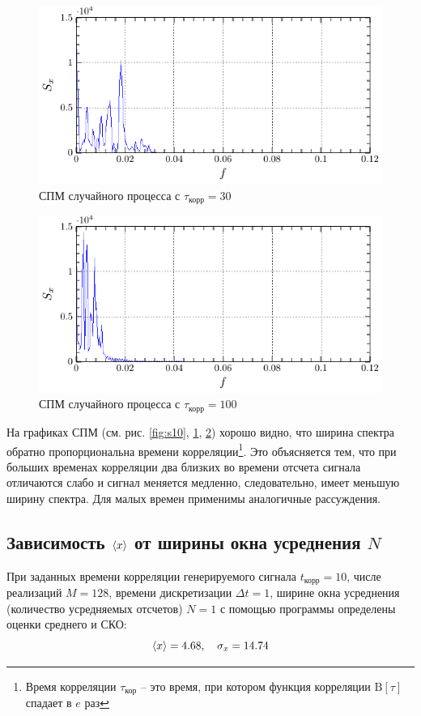 \documentclass[a4paper,14pt]{extarticle}
\begin{document}
\begin{figure}[H]
    \centering
    \includegraphics[width=0.7\linewidth]{fig/S_from_f_30.pdf}
    \vspace{-0.7em}
    \caption{СПМ случайного процесса с $\tau_\text{корр}=30$}
    \label{fig:s30}
\end{figure}

\begin{figure}[H]
    \centering
    \includegraphics[width=0.7\linewidth]{fig/S_from_f_100.pdf}
    \vspace{-0.7em}
    \caption{СПМ случайного процесса с $\tau_\text{корр}=100$}
    \label{fig:s100}
\end{figure}

На графиках СПМ (см. рис. \ref{fig:s10}, \ref{fig:s30}, \ref{fig:s100}) хорошо видно, что ширина спектра обратно пропорциональна времени корреляции\footnote{Время корреляции $\tau_\text{кор}$  -- это время, при котором функция корреляции $\mathrm{B}[\tau]$ спадает в $e$ раз}. Это объясняется тем, что при больших временах корреляции два близких во времени отсчета сигнала отличаются слабо и сигнал меняется медленно, следовательно, имеет меньшую ширину спектра. Для малых времен применимы аналогичные рассуждения.


\subsection{Зависимость $\langle x\rangle$ от ширины окна усреднения $N$}
При заданных времени корреляции генерируемого сигнала $t_\text{корр}=10$, числе реализаций $M=128$, времени дискретизации $\Delta t=1$, ширине окна усреднения (количество усредняемых отсчетов) $N=1$ с помощью программы определены оценки среднего и СКО:
\begin{equation}
    \langle x\rangle=4.68, \quad \sigma_x = 14.74
\end{equation}
\end{document}
